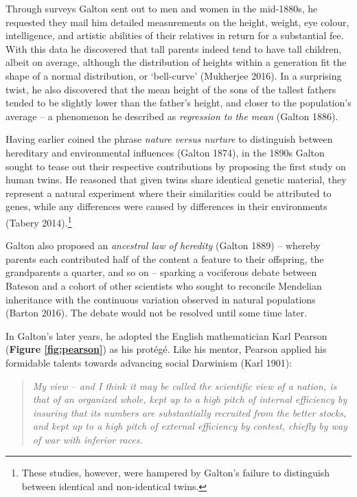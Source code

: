 \documentclass[
]{book}
\begin{document}
Through surveys Galton sent out to men and women in the mid-1880s, he requested they mail him detailed measurements on the height, weight, eye colour, intelligence, and artistic abilities of their relatives in return for a substantial fee. With this data he discovered that tall parents indeed tend to have tall children, albeit on average, although the distribution of heights within a generation fit the shape of a normal distribution, or `bell-curve' (Mukherjee 2016). In a surprising twist, he also discovered that the mean height of the sons of the tallest fathers tended to be slightly lower than the father's height, and closer to the population's average -- a phenomenon he described as \emph{regression to the mean} (Galton 1886).

Having earlier coined the phrase \emph{nature versus nurture} to distinguish between hereditary and environmental influences (Galton 1874), in the 1890s Galton sought to tease out their respective contributions by proposing the first study on human twins. He reasoned that given twins share identical genetic material, they represent a natural experiment where their similarities could be attributed to genes, while any differences were caused by differences in their environments (Tabery 2014).\footnote{These studies, however, were hampered by Galton's failure to distinguish between identical and non-identical twins.}

Galton also proposed an \emph{ancestral law of heredity} (Galton 1889) -- whereby parents each contributed half of the content a feature to their offspring, the grandparents a quarter, and so on -- sparking a vociferous debate between Bateson and a cohort of other scientists who sought to reconcile Mendelian inheritance with the continuous variation observed in natural populations (Barton 2016). The debate would not be resolved until some time later.

In Galton's later years, he adopted the English mathematician Karl Pearson (\textbf{Figure \ref{fig:pearson}}) as his protégé. Like his mentor, Pearson applied his formidable talents towards advancing social Darwinism (Karl 1901):

\begin{quote}
\emph{My view -- and I think it may be called the scientific view of a nation, is that of an organized whole, kept up to a high pitch of internal efficiency by insuring that its numbers are substantially recruited from the better stocks, and kept up to a high pitch of external efficiency by contest, chiefly by way of war with inferior races.}
\end{quote}
\end{document}
